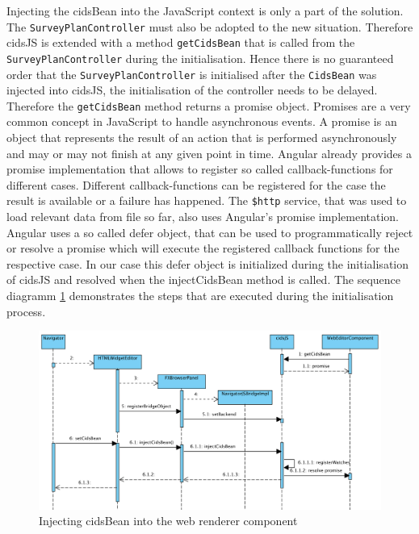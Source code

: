 Injecting the cidsBean into the JavaScript context is only a part of the solution.
The \texttt{SurveyPlanController} must also be adopted to the new situation.
Therefore cidsJS is extended with a method \texttt{getCidsBean} that is called from the \texttt{SurveyPlanController} during the initialisation.
Hence there is no guaranteed order that the \texttt{SurveyPlanController} is initialised after the \texttt{CidsBean} was injected into cidsJS, the initialisation of the controller needs to be delayed. 
Therefore the \texttt{getCidsBean} method returns a promise object.
Promises are a very common concept in JavaScript to handle asynchronous events. 
A promise is an object that represents the result of an action that is performed asynchronously and may or may not finish at any given point in time.
Angular already provides a promise implementation that allows to register so called callback-functions for different cases.
Different callback-functions can be registered for the case the result is available or a failure has happened.
The \texttt{\$http} service, that was used to load relevant data from file so far, also uses Angular’s promise implementation.
Angular uses a so called defer object, that can be used to programmatically reject or resolve a promise which will execute the registered callback functions for the respective case.
In our case this defer object is initialized during the initialisation of cidsJS and resolved when the injectCidsBean  method is called. The sequence diagramm \ref{fig:seq-diag-data-exchange-1} demonstrates the steps that are executed during the initialisation process. 

\begin{figure}
	\centering	\includegraphics[width=1.0\textwidth]{./img/classDiagramms/seq_diag_data_exchange.png}
	\caption{Injecting cidsBean into the web renderer component}
	\label{fig:seq-diag-data-exchange-1}
\end{figure}

